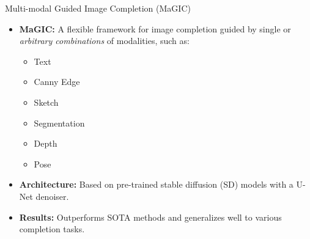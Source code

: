 \documentclass[pdf]{beamer}
\begin{document}

\begin{frame}{Multi-modal Guided Image Completion (MaGIC)~\cite{magic}}
    \begin{itemize}
        \item \textbf{MaGIC:} A flexible framework for image completion guided by single or \textit{arbitrary combinations} of modalities, such as:
        \begin{itemize}
            \item Text
            \item Canny Edge
            \item Sketch
            \item Segmentation
            \item Depth
            \item Pose
        \end{itemize}
        \item \textbf{Architecture:} Based on pre-trained stable diffusion (SD) models with a U-Net denoiser.
        \item \textbf{Results:} Outperforms SOTA methods and generalizes well to various completion tasks.
    \end{itemize}
\end{frame}
\end{document}
